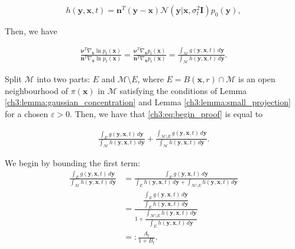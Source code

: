 \[
h(\textbf{y}, \textbf{x}, t) = \textbf{n}^T (\textbf{y}-\textbf{x}) \mathcal{N}(\textbf{y} | \textbf{x}, \sigma^2_t \textbf{I}) p_0(\textbf{y}),
\]

Then, we have

\begin{gather}
\label{ch3:eq:begin_proof}
    \frac{\boldsymbol{\nu}^T \nabla_\textbf{x} \ln p_t(\textbf{x})}{\textbf{n}^T \nabla_\textbf{x} \ln p_t(\textbf{x})}   = \frac{\boldsymbol{\nu}^T \nabla_\textbf{x}  p_t(\textbf{x})}{\textbf{n}^T \nabla_\textbf{x}  p_t(\textbf{x})} = \frac{\int_\mathcal{M} g(\textbf{y}, \textbf{x}, t)\, d\textbf{y}}{\int_\mathcal{M} h(\textbf{y}, \textbf{x}, t)\, d\textbf{y}}.
\end{gather}

Split $\mathcal{M}$ into two parts: $E$ and $\mathcal{M} \setminus E$, where $E=B(\textbf{x}, r) \cap \mathcal{M}$ is an open neighbourhood of $\pi(\textbf{x})$ in $\mathcal{M}$ satisfying the conditions of Lemma \ref{ch3:lemma:gaussian_concentration} and Lemma \ref{ch3:lemma:small_projection} for a chosen $\varepsilon > 0$. Then, we have that \eqref{ch3:eq:begin_proof} is equal to

\begin{gather}
    \label{ch3:eq:two_terms}
       \frac{\int_{E} g(\textbf{y}, \textbf{x}, t)\, d\textbf{y}}{\int_\mathcal{M} h(\textbf{y}, \textbf{x}, t)\, d\textbf{y}} + \frac{\int_{\mathcal{M} \setminus E} g(\textbf{y}, \textbf{x}, t)\, d\textbf{y}}{\int_\mathcal{M} h(\textbf{y}, \textbf{x}, t)\, d\textbf{y}}.
\end{gather}

\noindent We begin by bounding the first term:
\begin{align*}
    \frac{\int_{E} g(\textbf{y}, \textbf{x}, t)\, d\textbf{y}}{\int_\mathcal{M} h(\textbf{y}, \textbf{x}, t)\, d\textbf{y}} & = \frac{\int_{E} g(\textbf{y}, \textbf{x}, t)\, d\textbf{y}}{\int_E h(\textbf{y}, \textbf{x}, t)\, d\textbf{y} + \int_{\mathcal{M} \setminus E} h(\textbf{y}, \textbf{x}, t)\, d\textbf{y}} \\
    & = \frac{ \dfrac{\int_{E} g(\textbf{y}, \textbf{x}, t)\, d\textbf{y}}{\int_{E} h(\textbf{y}, \textbf{x}, t)\, d\textbf{y}}  }{1 + \dfrac{ \int_{\mathcal{M} \setminus E} h(\textbf{y}, \textbf{x}, t)\, d\textbf{y}}{\int_{E} h(\textbf{y}, \textbf{x}, t)\, d\textbf{y}}} \\
    & =: \frac{A_t}{1+B_t}.
\end{align*}

